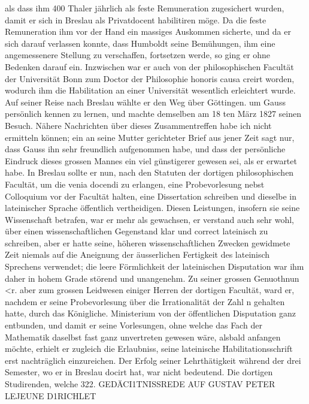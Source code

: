 \documentclass[11pt]{article}
\begin{document}
\noindent als dass ihm 400 Thaler jährlich als feste Remuneration zugesichert wurden, damit er sich in Breslau als Privatdocent habilitiren möge. Da die feste Remuneration ihm vor der Hand ein massiges Auskommen sicherte, und da er sich darauf verlassen konnte, dass Humboldt seine Bemühungen, ihm eine angemessenere Stellung zu verschaffen, fortsetzen werde, so ging er ohne Bedenken darauf ein. Inzwischen war er auch von der philosophischen Facultät der Universität Bonn zum Doctor der Philosophie honoris causa creirt worden, wodurch ihm die Habilitation an einer Universität wesentlich erleichtert wurde. Auf seiner Reise nach Breslau wählte er den Weg über Göttingen. um Gauss persönlich kennen zu lernen, und machte demselben am 18 ten März 1827 seinen Besuch. Nähere Nachrichten über dieses Zusammentreffen habe ich nicht ermitteln können; ein an seine Mutter gerichteter Brief aus jener Zeit sagt nur, dass Gauss ihn sehr freundlich aufgenommen habe, und dass der persönliche Eindruck dieses grossen Mannes ein viel günstigerer gewesen sei, als er erwartet habe. In Breslau sollte er nun, nach den Statuten der dortigen philosophischen Facultät, um die venia docendi zu erlangen, eine Probevorlesung nebst Colloquium vor der Facultät halten, eine Dissertation schreiben und dieselbe in lateinischer Sprache öffentlich vertheidigen. Diesen Leistungen, insofern sie seine Wissenschaft betrafen, war er mehr als gewachsen, er verstand auch sehr wohl, über einen wissenschaftlichen Gegenstand klar und correct lateinisch zu schreiben, aber er hatte seine, höheren wissenschaftlichen Zwecken gewidmete Zeit niemals auf die Aneignung der äusserlichen Fertigkeit des lateinisch Sprechens verwendet; die leere Förmlichkeit der lateinischen Disputation war ihm daher in hohem Grade störend und unangenehm. Zu seiner grossen Genuothnun <r. aber zum grossen Leidwesen einiger Herren der dortigen Facultät, ward er, nachdem er seine Probevorlesung über die Irrationalität der Zahl n gehalten hatte, durch das Königliche. Ministerium von der öffentlichen Disputation ganz entbunden, und damit er seine Vorlesungen, ohne welche das Fach der Mathematik daselbst fast ganz unvertreten gewesen wäre, alsbald anfangen möchte, erhielt er zugleich die Erlaubniss, seine lateinische Habilitationsschrift erst nachträglich einzureichen. Der Erfolg seiner Lehrthätigkeit während der drei Semester, wo er in Breslau docirt hat, war nicht bedeutend. Die dortigen Studirenden, welche 322. GEDÄCI1TNISSREDE AUF GUSTAV PETER LEJEUNE D1RICHLET
\par
\end{document}
